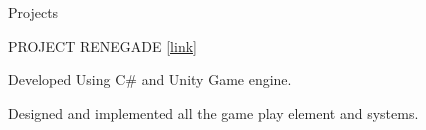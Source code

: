 \documentclass{resume}
\begin{document}
\begin{rSection}{Projects}
\begin{rSubsection}{PROJECT RENEGADE \href{https://knights-of-orange.itch.io/project-renegade}{[link]}}{}{}{}
\item Developed Using C\# and Unity Game engine. 
\item Designed and implemented all the game play element and systems.
\end{rSubsection}
\end{rSection}
\end{document}
